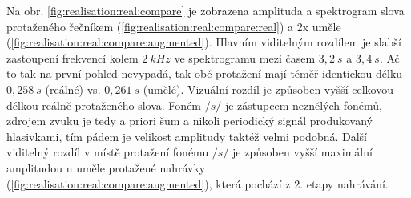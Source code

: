 Na obr. \ref{fig:realisation:real:compare} je zobrazena amplituda a spektrogram slova  protaženého řečníkem (\ref{fig:realisation:real:compare:real}) a 2x uměle (\ref{fig:realisation:real:compare:augmented}).
Hlavním viditelným rozdílem je slabší zastoupení frekvencí kolem $2\ kHz$ ve spektrogramu mezi časem $3,2\ s$ a $3,4\ s$.
Ač to tak na první pohled nevypadá, tak obě protažení mají téměř identickou délku $0,258\ s$ (reálné) vs. $0,261\ s$ (umělé).
Vizuální rozdíl je způsoben vyšší celkovou délkou reálně protaženého slova.
Foném $/s/$ je zástupcem neznělých fonémů, zdrojem zvuku je tedy a priori šum a nikoli periodický signál produkovaný hlasivkami, tím pádem je velikost amplitudy taktéž velmi podobná.
Další viditelný rozdíl v místě protažení fonému $/s/$ je způsoben vyšší maximální amplitudou u uměle protažené nahrávky (\ref{fig:realisation:real:compare:augmented}), která pochází z 2. etapy nahrávání.

